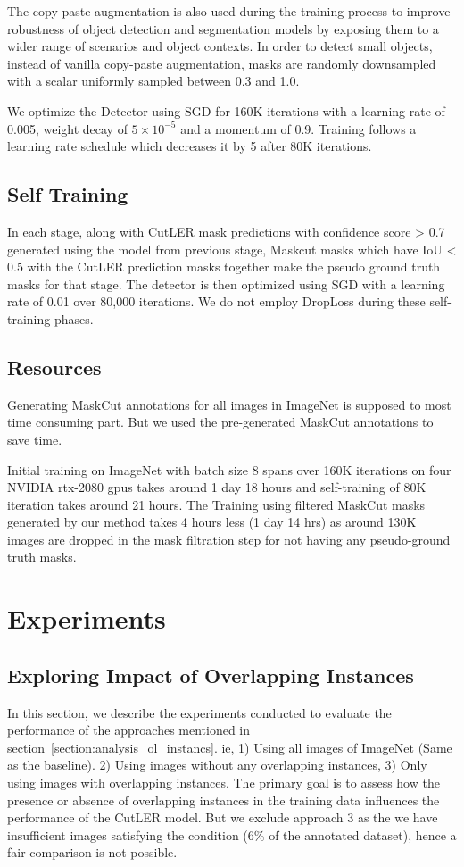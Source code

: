 The copy-paste augmentation is also used during the training process to improve robustness of object detection and segmentation models by exposing them to a wider range of scenarios and object contexts. In order to detect small objects, instead of vanilla copy-paste augmentation, masks are randomly downsampled with a scalar uniformly sampled between 0.3 and 1.0. 

We optimize the Detector using SGD for 160K iterations with a learning rate of 0.005, weight decay of \(5×10^{−5}\) and a momentum of 0.9. Training follows a learning rate schedule which decreases it by 5 after 80K iterations.

\subsection{Self Training}
In each stage, along with CutLER mask predictions with confidence score > 0.7 generated using the model from previous stage, Maskcut masks which have IoU < 0.5 with the CutLER prediction masks together make the pseudo ground truth masks for that stage. The detector is then optimized using SGD with a learning rate of 0.01 over 80,000 iterations. We do not employ DropLoss during these self-training phases.

\subsection{Resources}
Generating MaskCut annotations for all images in ImageNet is supposed to most time consuming part. But we used the pre-generated MaskCut annotations to save time.

Initial training on ImageNet with batch size 8 spans over 160K iterations on four NVIDIA rtx-2080 gpus takes around 1 day 18 hours and self-training of 80K iteration takes around 21 hours. The Training using filtered MaskCut masks generated by our method takes 4 hours less (1 day 14 hrs) as around 130K images are dropped in the mask filtration step for not having any pseudo-ground truth masks.


\section{Experiments}
\subsection{Exploring Impact of Overlapping Instances}
\label{section:overlap_experiment}
In this section, we describe the experiments conducted to evaluate the performance of the approaches mentioned in section~\ref{section:analysis_ol_instancs}. ie, 1) Using all images of ImageNet (Same as the baseline). 2) Using images without any overlapping instances, 3)  Only using images with overlapping instances. The primary goal is to assess how the presence or absence of overlapping instances in the training data influences the performance of the CutLER model. But we exclude approach 3 as the we have insufficient images satisfying the condition (6\% of the annotated dataset), hence a fair comparison is not possible.

